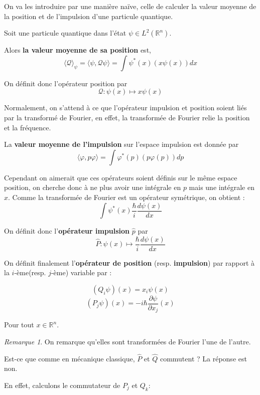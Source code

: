 \documentclass[a4paper, 12pt]{report}
\newcommand{\R}{\mathbb{R}} %
\renewcommand{\.}{\cdot} %
\theoremstyle{break}
\theoremstyle{remark}
\newtheorem{remark}{Remarque}
\theoremstyle{proofstyle}
\begin{document}
On va les introduire par une manière naïve, celle de calculer la valeur moyenne de la position et de l'impulsion d'une particule quantique.\vspace{10 pt}

Soit une particule quantique dans l'état $\psi \in L^2(\mathbb{R}^n)$. \vspace{10 pt}

Alors \textbf{la valeur moyenne de sa position} est,
$$\langle \mathcal{Q} \rangle_\psi = \langle \psi, \mathcal{Q} \psi \rangle = \int \psi^*(x)(x\psi(x))dx$$

On définit donc l'opérateur position par
$$\mathcal{Q} : \psi(x) \mapsto x \psi(x)$$

Normalement, on s'attend à ce que l'opérateur impulsion et position soient liés par la transformé de Fourier, en effet, la transformée de Fourier relie la position et la fréquence.\vspace{5pt}

La \textbf{valeur moyenne de l'impulsion} sur l'espace impulsion est donnée par
$$ \langle \varphi, p \varphi \rangle = \int \varphi^* (p)(p \varphi(p)) dp$$

Cependant on aimerait que ces opérateurs soient définis sur le même espace position, on cherche donc à ne plus avoir une intégrale en $p$ mais une intégrale en $x$. Comme la transformée de Fourier est un opérateur symétrique, on obtient :
$$\int \psi^* (x) \frac{\hbar}{i} \frac{d \psi(x)}{dx}$$

On définit donc l'\textbf{opérateur impulsion} $\hat{p}$ par
$$\hat{P}: \psi(x) \mapsto \frac{\hbar}{i} \frac{d \psi(x)}{dx}$$

On définit finalement l'\textbf{opérateur de position} (resp. \textbf{impulsion}) par rapport à la $i$-ème(resp. $j$-ème) variable par :

$$(Q_i \psi)(x) = x_i \psi(x)$$
$$(P_j \psi)(x) =-i \hbar \frac{\partial \psi}{ \partial x_j}(x)$$

Pour tout $x \in \R^n$.
\begin{remark}
    On remarque qu'elles sont transformées de Fourier l'une de l'autre.
\end{remark} \vspace{10 pt}

Est-ce que comme en mécanique classique, $\hat{P}$ et $\hat{Q}$ commutent ? La réponse est non.

En effet, calculons le commutateur de $P_j$ et $Q_k$: \vspace{10 pt}
\end{document}
